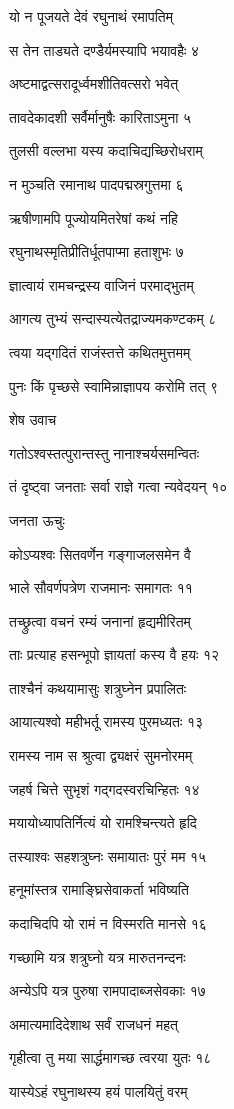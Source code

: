 यो न पूजयते देवं रघुनाथं रमापतिम्

स तेन ताड्यते दण्डैर्यमस्यापि भयावहैः ४

अष्टमाद्वत्सरादूर्ध्वमशीतिवत्सरो भवेत्

तावदेकादशी सर्वैर्मानुषैः कारिताऽमुना ५

तुलसी वल्लभा यस्य कदाचिद्यच्छिरोधराम्

न मुञ्चति रमानाथ पादपद्मस्रगुत्तमा ६

ऋषीणामपि पूज्योयमितरेषां कथं नहि

रघुनाथस्मृतिप्रीतिर्धूतपाप्मा हताशुभः ७

ज्ञात्वायं रामचन्द्रस्य वाजिनं परमाद्भुतम्

आगत्य तुभ्यं सन्दास्यत्येतद्राज्यमकण्टकम् ८

त्वया यद्गदितं राजंस्तत्ते कथितमुत्तमम्

पुनः किं पृच्छसे स्वामिन्नाज्ञापय करोमि तत् ९

शेष उवाच

गतोऽश्वस्तत्पुरान्तस्तु नानाश्चर्यसमन्वितः

तं दृष्ट्वा जनताः सर्वा राज्ञे गत्वा न्यवेदयन् १०

जनता ऊचुः

कोऽप्यश्वः सितवर्णेन गङ्गाजलसमेन वै

भाले सौवर्णपत्रेण राजमानः समागतः ११

तच्छ्रुत्वा वचनं रम्यं जनानां हृद्यमीरितम्

ताः प्रत्याह हसन्भूपो ज्ञायतां कस्य वै हयः १२

ताश्चैनं कथयामासुः शत्रुघ्नेन प्रपालितः

आयात्यश्वो महीभर्तू रामस्य पुरमध्यतः १३

रामस्य नाम स श्रुत्वा द्व्यक्षरं सुमनोरमम्

जहर्ष चित्ते सुभृशं गद्गदस्वरचिन्हितः १४

मयायोध्यापतिर्नित्यं यो रामश्चिन्त्यते हृदि

तस्याश्वः सहशत्रुघ्नः समायातः पुरं मम १५

हनूमांस्तत्र रामाङ्घ्रिसेवाकर्ता भविष्यति

कदाचिदपि यो रामं न विस्मरति मानसे १६

गच्छामि यत्र शत्रुघ्नो यत्र मारुतनन्दनः

अन्येऽपि यत्र पुरुषा रामपादाब्जसेवकाः १७

अमात्यमादिदेशाथ सर्वं राजधनं महत्

गृहीत्वा तु मया सार्द्धमागच्छ त्वरया युतः १८

यास्येऽहं रघुनाथस्य हयं पालयितुं वरम्

